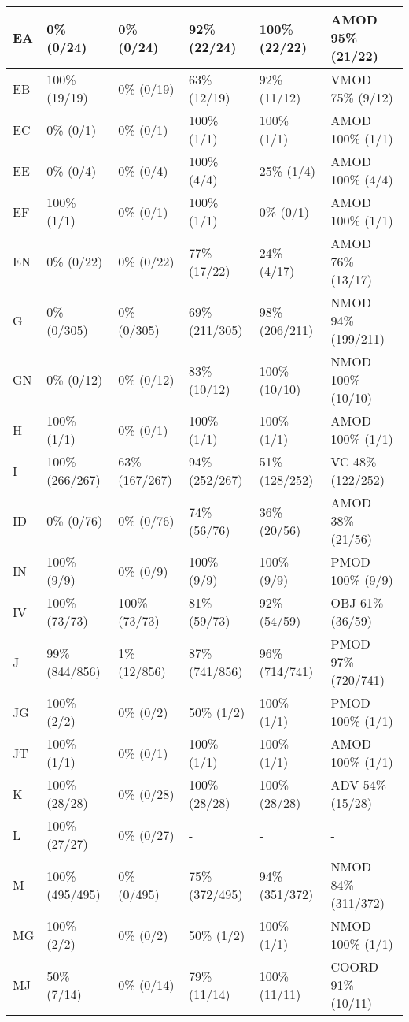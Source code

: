 \begin{figure*}
\begin{tabular}{|l|l|l|l|l|l|}
\hline
EA & 0\% (0/24) & 0\% (0/24) & 92\% (22/24) & 100\% (22/22) & AMOD 95\% (21/22) \\ 
\hline
EB & 100\% (19/19) & 0\% (0/19) & 63\% (12/19) & 92\% (11/12) & VMOD 75\% (9/12) \\ 
\hline
EC & 0\% (0/1) & 0\% (0/1) & 100\% (1/1) & 100\% (1/1) & AMOD 100\% (1/1) \\ 
\hline
EE & 0\% (0/4) & 0\% (0/4) & 100\% (4/4) & 25\% (1/4) & AMOD 100\% (4/4) \\ 
\hline
EF & 100\% (1/1) & 0\% (0/1) & 100\% (1/1) & 0\% (0/1) & AMOD 100\% (1/1) \\ 
\hline
EN & 0\% (0/22) & 0\% (0/22) & 77\% (17/22) & 24\% (4/17) & AMOD 76\% (13/17) \\ 
\hline
G & 0\% (0/305) & 0\% (0/305) & 69\% (211/305) & 98\% (206/211) & NMOD 94\% (199/211) \\ 
\hline
GN & 0\% (0/12) & 0\% (0/12) & 83\% (10/12) & 100\% (10/10) & NMOD 100\% (10/10) \\ 
\hline
H & 100\% (1/1) & 0\% (0/1) & 100\% (1/1) & 100\% (1/1) & AMOD 100\% (1/1) \\ 
\hline
I & 100\% (266/267) & 63\% (167/267) & 94\% (252/267) & 51\% (128/252) & VC 48\% (122/252) \\ 
\hline
ID & 0\% (0/76) & 0\% (0/76) & 74\% (56/76) & 36\% (20/56) & AMOD 38\% (21/56) \\ 
\hline
IN & 100\% (9/9) & 0\% (0/9) & 100\% (9/9) & 100\% (9/9) & PMOD 100\% (9/9) \\ 
\hline
IV & 100\% (73/73) & 100\% (73/73) & 81\% (59/73) & 92\% (54/59) & OBJ 61\% (36/59) \\ 
\hline
J & 99\% (844/856) & 1\% (12/856) & 87\% (741/856) & 96\% (714/741) & PMOD 97\% (720/741) \\ 
\hline
JG & 100\% (2/2) & 0\% (0/2) & 50\% (1/2) & 100\% (1/1) & PMOD 100\% (1/1) \\ 
\hline
JT & 100\% (1/1) & 0\% (0/1) & 100\% (1/1) & 100\% (1/1) & AMOD 100\% (1/1) \\ 
\hline
K & 100\% (28/28) & 0\% (0/28) & 100\% (28/28) & 100\% (28/28) & ADV 54\% (15/28) \\ 
\hline
L & 100\% (27/27) & 0\% (0/27) & - & - & - \\ 
\hline
M & 100\% (495/495) & 0\% (0/495) & 75\% (372/495) & 94\% (351/372) & NMOD 84\% (311/372) \\ 
\hline
MG & 100\% (2/2) & 0\% (0/2) & 50\% (1/2) & 100\% (1/1) & NMOD 100\% (1/1) \\ 
\hline
MJ & 50\% (7/14) & 0\% (0/14) & 79\% (11/14) & 100\% (11/11) & COORD 91\% (10/11) \\ 

\end{tabular}
\end{figure*}
